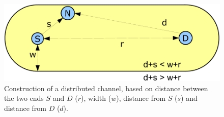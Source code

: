 \documentclass[12pt,a4paper,twoside,openright]{book}
\begin{document}
\begin{figure}
\centering\includegraphics[width=\textwidth]{img/channel}
\caption[Distributed channel]{Construction of a distributed channel, based on distance between the two ends $S$ and $D$ ($r$), width ($w$), distance from $S$ ($s$) and distance from $D$ ($d$).}\label{f:preview}
\end{figure}
\end{document}
